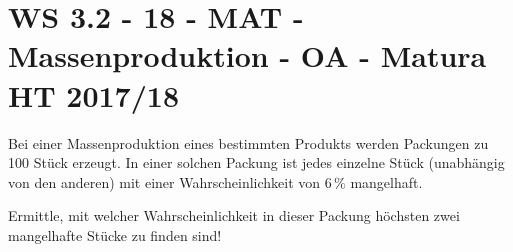 \section{WS 3.2 - 18 - MAT - Massenproduktion - OA - Matura HT 2017/18}

\begin{beispiel}[WS 3.2]{1} %
Bei einer Massenproduktion eines bestimmten Produkts werden Packungen zu 100 Stück erzeugt. In einer solchen Packung ist jedes einzelne Stück (unabhängig von den anderen) mit einer Wahrscheinlichkeit von $6\,\%$ mangelhaft.

Ermittle, mit welcher Wahrscheinlichkeit in dieser Packung höchsten zwei mangelhafte Stücke zu finden sind!\leer

\end{beispiel}